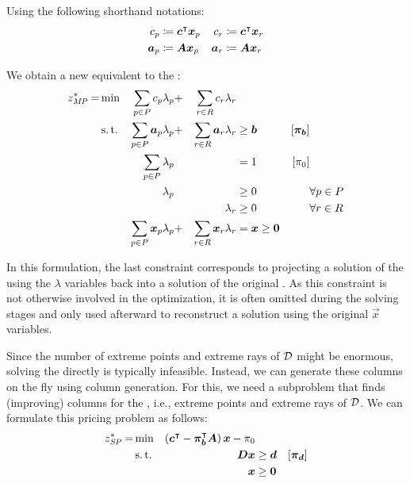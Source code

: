 Using the following shorthand notations:
\begin{equation}
\begin{aligned}
c_p &\coloneqq {\bm{c}}^\intercal {\bm{x}}_p
&c_r &\coloneqq {\bm{c}}^\intercal {\bm{x}}_r \\
{\bm{a}}_p &\coloneqq {\bm{A}} {\bm{x}}_p
&{\bm{a}}_r &\coloneqq {\bm{A}} {\bm{x}}_r
\end{aligned}
\end{equation}

We obtain a new \MP{} equivalent to the \LP{}:
\begin{equation}
\begin{aligned}
z^*_{\textit{MP}}{} = &\min & \sum_{p \in P} c_p \lambda_p &+ &\sum_{r \in R} c_r \lambda_r & & & \\
&\operatorname{s.t.} & \sum_{p \in P} {\bm{a}}_p \lambda_p &+ &\sum_{r \in R} {\bm{a}}_r \lambda_r & \geq {\bm{b}} & \left[{\bm{\pi}}_{\bm{b}}\right] \\
&& \sum_{p \in P} \lambda_p & & & = 1 & \left[\pi_0 \right] & \\
&& \lambda_p & & & \geq 0 & & \forall p \in P \\
&& & & \lambda_r & \geq 0 & & \forall r \in R \\
&& \sum_{p \in P} {\bm{x}}_p \lambda_p &+ &\sum_{r \in R} {\bm{x}}_r \lambda_r & = {\bm{x}} \geq {\bm{0}} & &
\end{aligned}
\end{equation}

In this formulation, the last constraint corresponds to projecting a solution of the \MP{} using the $\lambda$ variables back into a solution of the original \LP{}. As this constraint is not otherwise involved in the optimization, it is often omitted during the solving stages and only used afterward to reconstruct a solution using the original $\vec{x}$ variables.

Since the number of extreme points and extreme rays of $\mathcal{D}$ might be enormous, solving the \MP{} directly is typically infeasible. Instead, we can generate these columns on the fly using column generation. For this, we need a subproblem that finds (improving) columns for the \MP{}, i.e., extreme points and extreme rays of $\mathcal{D}$. We can formulate this pricing problem as follows:
\begin{equation}
\begin{aligned}
z^*_\SP{} = &\min & \left( \vec{c}\transpose - \vec{\pi}_\vec{b}\transpose \mat{A} \right) \vec{x} - \pi_0 & & \\
&\st & \mat{D} \vec{x} & \geq \vec{d} & \left[\vec{\pi}_\vec{d}\right] \\
&& \vec{x} & \geq \vec{0}
\end{aligned}
\end{equation}

